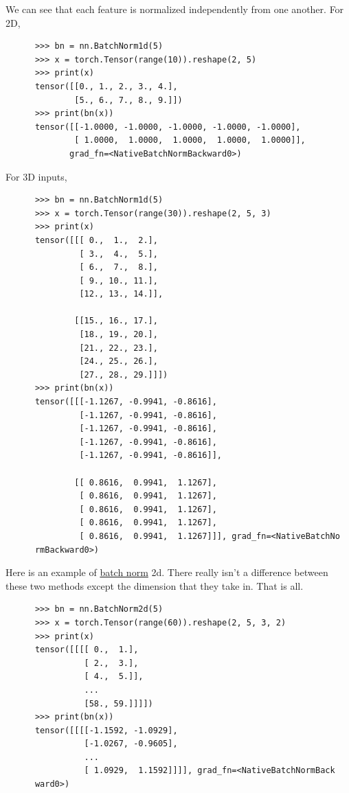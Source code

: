   \begin{example}
    \label{ex:batch-norm-1d}
    We can see that each feature is normalized independently from one another. For 2D, 
    \begin{lstlisting}
      >>> bn = nn.BatchNorm1d(5)
      >>> x = torch.Tensor(range(10)).reshape(2, 5)
      >>> print(x) 
      tensor([[0., 1., 2., 3., 4.],
              [5., 6., 7., 8., 9.]])
      >>> print(bn(x))
      tensor([[-1.0000, -1.0000, -1.0000, -1.0000, -1.0000],
              [ 1.0000,  1.0000,  1.0000,  1.0000,  1.0000]],
             grad_fn=<NativeBatchNormBackward0>)
    \end{lstlisting}
    For 3D inputs, 
    \begin{lstlisting}
      >>> bn = nn.BatchNorm1d(5)
      >>> x = torch.Tensor(range(30)).reshape(2, 5, 3)
      >>> print(x) 
      tensor([[[ 0.,  1.,  2.],
               [ 3.,  4.,  5.],
               [ 6.,  7.,  8.],
               [ 9., 10., 11.],
               [12., 13., 14.]],

              [[15., 16., 17.],
               [18., 19., 20.],
               [21., 22., 23.],
               [24., 25., 26.],
               [27., 28., 29.]]])
      >>> print(bn(x))
      tensor([[[-1.1267, -0.9941, -0.8616],
               [-1.1267, -0.9941, -0.8616],
               [-1.1267, -0.9941, -0.8616],
               [-1.1267, -0.9941, -0.8616],
               [-1.1267, -0.9941, -0.8616]],

              [[ 0.8616,  0.9941,  1.1267],
               [ 0.8616,  0.9941,  1.1267],
               [ 0.8616,  0.9941,  1.1267],
               [ 0.8616,  0.9941,  1.1267],
               [ 0.8616,  0.9941,  1.1267]]], grad_fn=<NativeBatchNo
      rmBackward0>)
    \end{lstlisting}
  \end{example}

  \begin{example}
    \label{ex:batch-norm-2d}
    Here is an example of \hyperref[def:batch-norm]{batch norm} 2d. There really isn't a difference between these two methods except the dimension that they take in. That is all. 
    \begin{lstlisting}
      >>> bn = nn.BatchNorm2d(5)
      >>> x = torch.Tensor(range(60)).reshape(2, 5, 3, 2)
      >>> print(x) 
      tensor([[[[ 0.,  1.],
                [ 2.,  3.],
                [ 4.,  5.]],
                ...
                [58., 59.]]]])
      >>> print(bn(x))
      tensor([[[[-1.1592, -1.0929],
                [-1.0267, -0.9605],
                ...
                [ 1.0929,  1.1592]]]], grad_fn=<NativeBatchNormBack
      ward0>)
    \end{lstlisting}
  \end{example}

